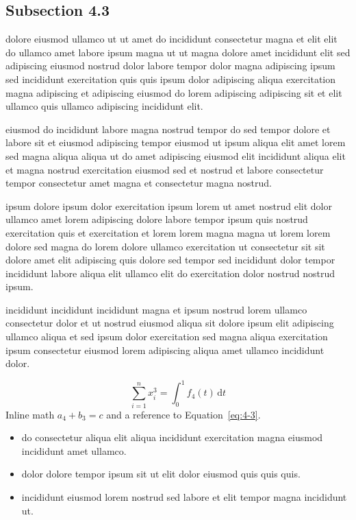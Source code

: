 \documentclass{article}
\begin{document}
\subsection{Subsection 4.3}\label{sec:4-3}
dolore eiusmod ullamco ut ut amet do incididunt consectetur magna et elit elit do ullamco amet labore ipsum magna ut ut magna dolore amet incididunt elit sed adipiscing eiusmod nostrud dolor labore tempor dolor magna adipiscing ipsum sed incididunt exercitation quis quis ipsum dolor adipiscing aliqua exercitation magna adipiscing et adipiscing eiusmod do lorem adipiscing adipiscing sit et elit ullamco quis ullamco adipiscing incididunt elit.

eiusmod do incididunt labore magna nostrud tempor do sed tempor dolore et labore sit et eiusmod adipiscing tempor eiusmod ut ipsum aliqua elit amet lorem sed magna aliqua aliqua ut do amet adipiscing eiusmod elit incididunt aliqua elit et magna nostrud exercitation eiusmod sed et nostrud et labore consectetur tempor consectetur amet magna et consectetur magna nostrud.

ipsum dolore ipsum dolor exercitation ipsum lorem ut amet nostrud elit dolor ullamco amet lorem adipiscing dolore labore tempor ipsum quis nostrud exercitation quis et exercitation et lorem lorem magna magna ut lorem lorem dolore sed magna do lorem dolore ullamco exercitation ut consectetur sit sit dolore amet elit adipiscing quis dolore sed tempor sed incididunt dolor tempor incididunt labore aliqua elit ullamco elit do exercitation dolor nostrud nostrud ipsum.

incididunt incididunt incididunt magna et ipsum nostrud lorem ullamco consectetur dolor et ut nostrud eiusmod aliqua sit dolore ipsum elit adipiscing ullamco aliqua et sed ipsum dolor exercitation sed magna aliqua exercitation ipsum consectetur eiusmod lorem adipiscing aliqua amet ullamco incididunt dolor.

\begin{equation}\label{eq:4-3}
  \sum_{i=1}^{n} x_i^{3} = \int_0^1 f_{4}(t)\,\mathrm{d}t
\end{equation}
Inline math $a_{4} + b_{3} = c$ and a reference to Equation~\eqref{eq:4-3}.

\begin{itemize}
  \item do consectetur aliqua elit aliqua incididunt exercitation magna eiusmod incididunt amet ullamco.
  \item dolor dolore tempor ipsum sit ut elit dolor eiusmod quis quis quis.
  \item incididunt eiusmod lorem nostrud sed labore et elit tempor magna incididunt ut.
\end{itemize}
\end{document}
